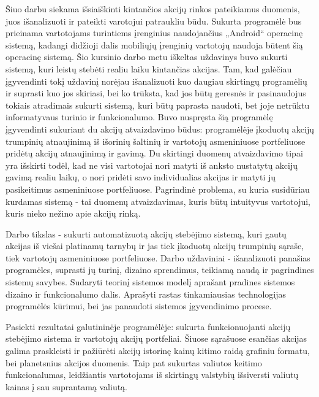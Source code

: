 Šiuo darbu siekama išsiaiškinti kintančios akcijų rinkos pateikiamus duomenis, juos išanalizuoti ir pateikti varotojui patraukliu būdu. Sukurta programėlė bus prieinama vartotojams turintiems įrenginius naudojančius „Android“ operacinę sistemą, kadangi didžioji dalis mobiliųjų įrenginių vartotojų naudoja būtent šią operacinę sistemą. Šio kursinio darbo metu iškeltas uždavinys buvo sukurti sistemą, kuri leistų stebėti realiu laiku kintančias akcijas. Tam, kad galėčiau įgyvendinti tokį uždavinį norėjau išanalizuoti kuo daugiau skirtingų programėlių ir suprasti kuo jos skiriasi, bei ko trūksta, kad jos būtų geresnės ir pasinaudojus tokiais atradimais sukurti sistemą, kuri būtų paprasta naudoti, bet joje netrūktu informatyvaus turinio ir funkcionalumo. Buvo nuspręsta šią programėlę įgyvendinti sukuriant du akcijų atvaizdavimo būdus: programėlėje įkoduotų akcijų trumpinių atnaujinimą iš išorinių šaltinių ir vartotojų asmeniniuose portfeliuose pridėtų akcijų atnaujinimą ir gavimą. Du skirtingi duomenų atvaizdavimo tipai yra išskirti todėl, kad ne visi vartotojai nori matyti iš anksto nustatytų akcijų gavimą realiu laikų, o nori pridėti savo individualias akcijas ir matyti jų pasikeitimus asmeniniuose portfeliuose. Pagrindinė problema, su kuria susidūriau kurdamas sistemą - tai duomenų atvaizdavimas, kuris būtų intuityvus vartotojui, kuris nieko nežino apie akcijų rinką.

Darbo tikslas - sukurti automatizuotą akcijų stebėjimo sistemą, kuri gautų akcijas iš viešai platinamų tarnybų ir jas tiek įkoduotų akcijų trumpinių sąraše, tiek vartotojų asmeniniuose portfeliuose. Darbo uždaviniai - išanalizuoti panašias programėles, suprasti jų turinį, dizaino sprendimus, teikiamą naudą ir pagrindines sistemų savybes. Sudaryti teorinį sistemos modelį aprašant pradines sistemos dizaino ir funkcionalumo dalis. Aprašyti rastas tinkamiausias technologijas programėlės kūrimui, bei jas panaudoti sistemos įgyvendinimo procese.

Pasiekti rezultatai galutininėje programėlėje: sukurta funkcionuojanti akcijų stebėjimo sistema ir vartotojų akcijų portfeliai. Šiuose sąrašuose esančias akcijas galima praskleisti ir pažiūrėti akcijų istorinę kainų kitimo raidą grafiniu formatu, bei planetsnius akcijos duomenis. Taip pat sukurtas valiutos keitimo funkcionalumas, leidžiantis vartotojams iš skirtingų valstybių išsiversti valiutų kainas į sau suprantamą valiutą.